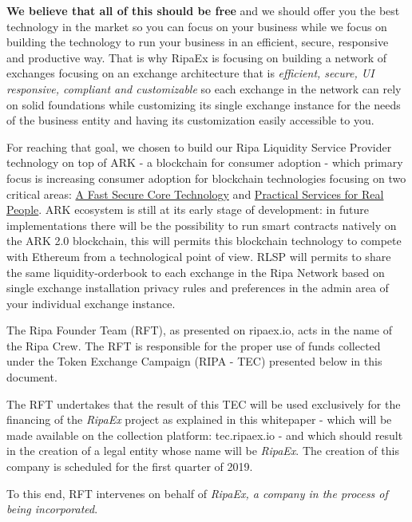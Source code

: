 \documentclass[11pt,fleqn]{book} %
\begin{document}
\textbf{We believe that all of this should be free} and we should offer you the best technology in the market so you can focus on your business
while we focus on building the technology to run your business in an efficient, secure, responsive and productive way. That is why RipaEx 
is focusing on building a network of exchanges focusing on an exchange architecture that is \textit{efficient, secure, UI responsive, compliant and customizable}
so each exchange in the network can rely on solid foundations while customizing its single exchange instance for the needs of
the business entity and having its customization easily accessible to you.

For reaching that goal, we chosen to build our Ripa Liquidity Service Provider technology on top of ARK - a blockchain for consumer adoption - 
which primary focus is increasing consumer adoption for blockchain technologies focusing on two critical areas: \underline{A Fast Secure Core Technology}
and \underline{Practical Services for Real People}. ARK ecosystem is still at its early stage of development: in future implementations 
there will be the possibility to run smart contracts natively on the ARK 2.0 blockchain, this will permits this blockchain technology to compete 
with Ethereum from a technological point of view. RLSP will permits to share the same liquidity-orderbook to each exchange in the Ripa Network based on
single exchange installation privacy rules and preferences in the admin area of your individual exchange instance.

The Ripa Founder Team (RFT), as presented on ripaex.io, acts in the name of the Ripa Crew. The RFT is responsible for the proper use of 
funds collected under the Token Exchange Campaign (RIPA - TEC) presented below in this document.

The RFT undertakes that the result of this TEC will be used exclusively for the financing of the \emph{RipaEx} project as explained in this 
whitepaper - which will be made available on the collection platform: tec.ripaex.io - and which should result in the creation of a 
legal entity whose name will be \emph{RipaEx}. The creation of this company is scheduled for the first quarter of 2019.

To this end, RFT intervenes on behalf of \emph{RipaEx, a company in the process of being incorporated}.
\end{document}
